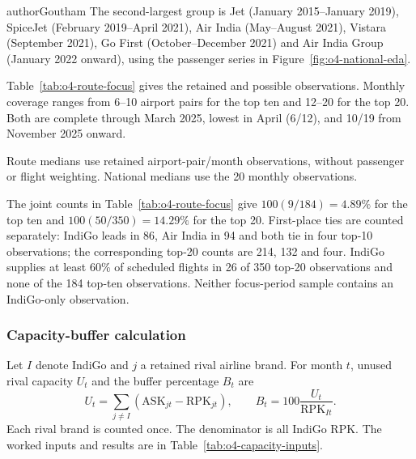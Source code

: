\begin{mergedcontribution}{authorGoutham}
The second-largest group is Jet (January 2015--January 2019), SpiceJet (February 2019--April 2021), Air India (May--August 2021), Vistara (September 2021), Go First (October--December 2021) and Air India Group (January 2022 onward), using the passenger series in Figure~\ref{fig:o4-national-eda}.


\label{app:o4-route-focus}
Table~\ref{tab:o4-route-focus} gives the retained and possible observations. Monthly coverage ranges from 6--10 airport pairs for the top ten and 12--20 for the top 20. Both are complete through March 2025, lowest in April (6/12), and 10/19 from November 2025 onward.

Route medians use retained airport-pair/month observations, without passenger or flight weighting. National medians use the 20 monthly observations.

The joint counts in Table~\ref{tab:o4-route-focus} give $100(9/184)=4.89\%$ for the top ten and $100(50/350)=14.29\%$ for the top 20.
First-place ties are counted separately: IndiGo leads in 86, Air India in 94 and both tie in four top-10 observations; the corresponding top-20 counts are 214, 132 and four. IndiGo supplies at least 60\% of scheduled flights in 26 of 350 top-20 observations and none of the 184 top-ten observations. Neither focus-period sample contains an IndiGo-only observation.

\subsubsection{Capacity-buffer calculation}
\label{app:o4-capacity-buffer}
Let $I$ denote IndiGo and $j$ a retained rival airline brand. For month $t$, unused rival capacity $U_t$ and the buffer percentage $B_t$ are
\[
U_t=\sum_{j\ne I}(\mathrm{ASK}_{jt}-\mathrm{RPK}_{jt}),
\qquad B_t=100\frac{U_t}{\mathrm{RPK}_{It}}.
\]
Each rival brand is counted once. The denominator is all IndiGo RPK. The worked inputs and results are in Table~\ref{tab:o4-capacity-inputs}.


\end{mergedcontribution}
